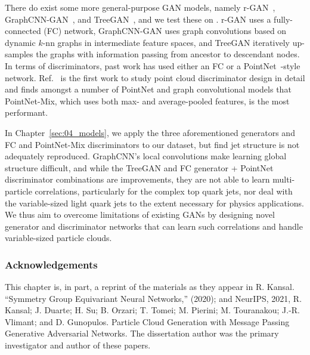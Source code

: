 There do exist some more general-purpose GAN models, namely r-GAN~\cite{rgan}, GraphCNN-GAN~\cite{graphcnngan}, and TreeGAN~\cite{treegan}, and we test these on \jetnet.
r-GAN uses a fully-connected (FC) network, GraphCNN-GAN uses graph convolutions based on dynamic $k$-nn graphs in intermediate feature spaces, and TreeGAN iteratively up-samples the graphs with information passing from ancestor to descendant nodes.
In terms of discriminators, past work has used either an FC or a PointNet~\cite{pointnet}-style network.
Ref.~\cite{wang2020rethinking} is the first work to study point cloud discriminator design in detail and finds amongst a number of PointNet and graph convolutional models that PointNet-Mix, which uses both max- and average-pooled features, is the most performant.

In Chapter~\ref{sec:04_models}, we apply the three aforementioned generators and FC and PointNet-Mix discriminators to our dataset, but find jet structure is not adequately reproduced.
GraphCNN's local convolutions make learning global structure difficult, and while the TreeGAN and FC generator + PointNet discriminator combinations are improvements, they are not able to learn multi-particle correlations, particularly for the complex top quark jets, nor deal with the variable-sized light quark jets to the extent necessary for physics applications.
We thus aim to overcome limitations of existing GANs by designing novel generator and discriminator networks that can learn such correlations and handle variable-sized particle clouds.

\subsubsection{Acknowledgements}

This chapter is, in part, a reprint of the materials as they appear in
R. Kansal. ``Symmetry Group Equivariant Neural Networks,'' (2020);
and
NeurIPS, 2021, R. Kansal; J. Duarte; H. Su; B. Orzari; T. Tomei; M. Pierini; M. Touranakou; J.-R. Vlimant; and D. Gunopulos. Particle Cloud Generation with Message Passing Generative Adversarial Networks.
The dissertation author was the primary investigator and author of these papers.
